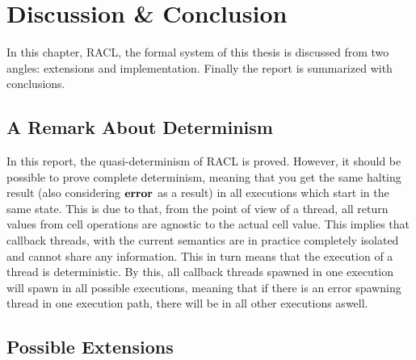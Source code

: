 \chapter{Discussion \& Conclusion}
\label{cha:discussion_and_conclusion}

In this chapter, RACL, the formal system of this thesis is discussed from two
angles: extensions and implementation. Finally the report is summarized with
conclusions.


\section{A Remark About Determinism}%
\label{sec:a_remark_about_determinism}

In this report, the quasi-determinism of RACL is proved. However, it
should be possible to prove complete determinism, meaning that you get the same
halting result (also considering $\mbox{{\bf error}}$ as a result) in all executions which
start in the same state. This is due to that, from the point of view of a
thread, all return values from cell operations are agnostic to the actual
cell value.  This implies that callback threads, with the current semantics are
in practice completely isolated and cannot share any information. This in turn
means that the execution of a thread is deterministic. By this, all callback
threads spawned in one execution will spawn in all possible executions, meaning
that if there is an error spawning thread in one execution path, there will be
in all other executions aswell.

\section{Possible Extensions}%
\label{sec:extensions}

